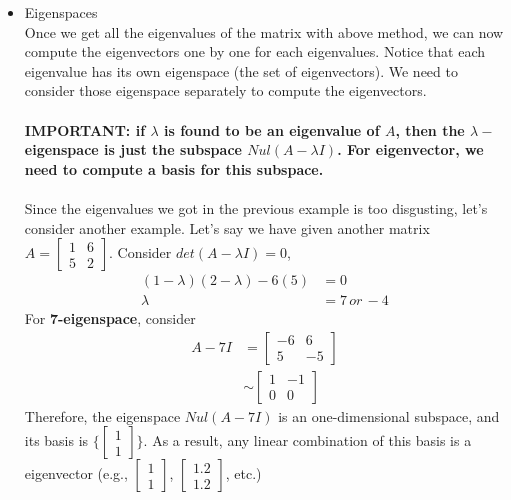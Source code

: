 \documentclass[11pt]{article}
\begin{document}
\begin{itemize}
	\item Eigenspaces\\
	Once we get all the eigenvalues of the matrix with above method, we can now compute the eigenvectors one by one for each eigenvalues. Notice that each eigenvalue has its own eigenspace (the set of eigenvectors). We need to consider those eigenspace separately to compute the eigenvectors.\\\\
	\textbf{IMPORTANT: if $\lambda$ is found to be an eigenvalue of $A$, then the $\lambda-$eigenspace is just the subspace $Nul(A-\lambda I)$. For eigenvector, we need to compute a basis for this subspace.}\\\\
	Since the eigenvalues we got in the previous example is too disgusting, let's consider another example. Let's say we have given another matrix $A = 
	\begin{bmatrix}
	1& 6\\
	5& 2
	\end{bmatrix}$. Consider $det(A-\lambda I) = 0$,
	\begin{align*}
	(1-\lambda )(2- \lambda )- 6(5) &=0\\
	\lambda&= 7 \,or\, -4
	\end{align*}
	For \textbf{7-eigenspace}, consider\\
	\begin{align*}
		A - 7I &= 
		\begin{bmatrix}
		-6& 6\\
		5& -5
		\end{bmatrix}\\
		& \sim \begin{bmatrix}
		1& -1\\
		0& 0
		\end{bmatrix}
	\end{align*}
	Therefore, the eigenspace $Nul(A - 7I)$ is an one-dimensional subspace, and its basis is $\{
	\begin{bmatrix}
	1\\
	1
	\end{bmatrix}
	\}$. As a result, any linear combination of this basis is a eigenvector (e.g., $
	\begin{bmatrix}
	1\\
	1
	\end{bmatrix}
	$, $\begin{bmatrix}
	1.2\\
	1.2
	\end{bmatrix}$, etc.)\\

\end{itemize}
\end{document}
